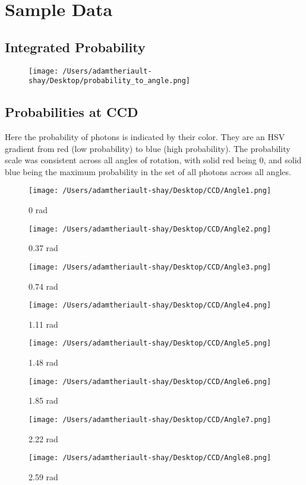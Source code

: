 \documentclass[11pt, oneside]{article}   	%
\begin{document}
\section{Sample Data}

\subsection{Integrated Probability}
\begin{figure}[h!]
\texttt{[image: /Users/adamtheriault-shay/Desktop/probability\_to\_angle.png]}
\end{figure}

 \subsection{Probabilities at CCD}
 Here the probability of photons is indicated by their color. They are an HSV gradient from red (low probability) to blue (high probability). The probability scale was consistent across all angles of rotation, with solid red being 0, and solid blue being the maximum probability in the set of all photons across all angles.
 
\newpage
\begin{figure}
\centering
\texttt{[image: /Users/adamtheriault-shay/Desktop/CCD/Angle1.png]}
\caption{0 rad}
\texttt{[image: /Users/adamtheriault-shay/Desktop/CCD/Angle2.png]}
\caption{0.37 rad}
\end{figure}

\newpage
\begin{figure}
\texttt{[image: /Users/adamtheriault-shay/Desktop/CCD/Angle3.png]}
\caption{0.74 rad}
\texttt{[image: /Users/adamtheriault-shay/Desktop/CCD/Angle4.png]}
\caption{1.11 rad}
\end{figure}


\newpage
\begin{figure}
\texttt{[image: /Users/adamtheriault-shay/Desktop/CCD/Angle5.png]}
\caption{1.48 rad}
\texttt{[image: /Users/adamtheriault-shay/Desktop/CCD/Angle6.png]}
\caption{1.85 rad}
\end{figure}

\newpage
\begin{figure}
\texttt{[image: /Users/adamtheriault-shay/Desktop/CCD/Angle7.png]}
\caption{2.22 rad}
\texttt{[image: /Users/adamtheriault-shay/Desktop/CCD/Angle8.png]}
\caption{2.59 rad}
\end{figure}
\end{document}
